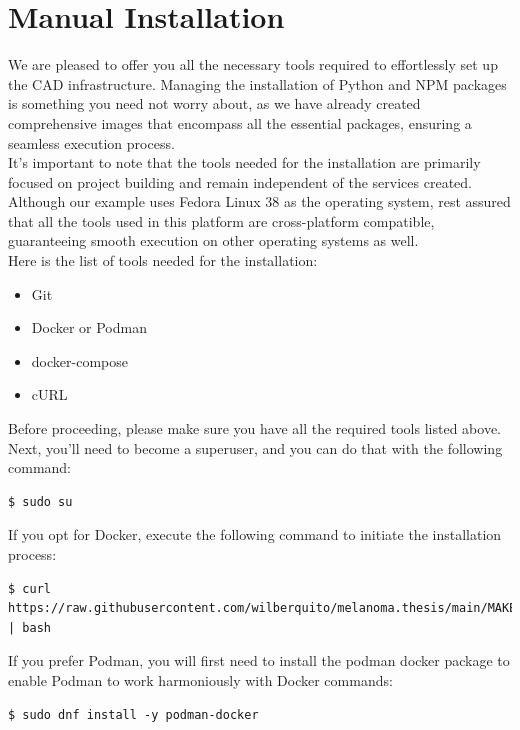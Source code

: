 \section{Manual Installation}
\label{appendix:appendix_a}

We are pleased to offer you all the necessary tools required to effortlessly set up the CAD infrastructure.
Managing the installation of Python and NPM packages is something you need not worry about,
as we have already created comprehensive images that encompass all the essential packages,
ensuring a seamless execution process. \\

It's important to note that the tools needed for the installation are
primarily focused on project building and remain independent of the services created.
Although our example uses Fedora Linux 38 as the operating system,
rest assured that all the tools used in this platform are cross-platform compatible,
guaranteeing smooth execution on other operating systems as well. \\


Here is the list of tools needed for the installation:

\begin{itemize}
  \item Git
  \item Docker or Podman
  \item docker-compose
  \item cURL
\end{itemize}

Before proceeding, please make sure you have all the required tools listed above.
Next, you'll need to become a superuser, and you can do that with the following command:

\begin{Verbatim}[fontsize=\scriptsize]
$ sudo su
\end{Verbatim}

If you opt for Docker, execute the following command to initiate the installation process:

\begin{Verbatim}[fontsize=\scriptsize]
$ curl https://raw.githubusercontent.com/wilberquito/melanoma.thesis/main/MAKE.sh | bash
\end{Verbatim}

If you prefer Podman,
you will first need to install the podman docker package to enable Podman to work harmoniously with Docker commands:

\begin{Verbatim}[fontsize=\scriptsize]
$ sudo dnf install -y podman-docker
\end{Verbatim}

